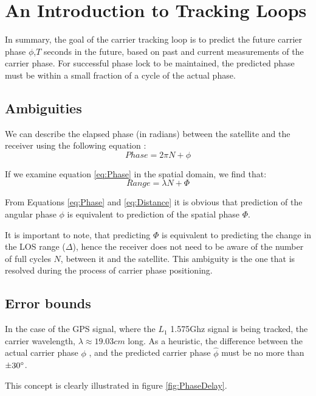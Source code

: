 \label{app9}
\chapter{An Introduction to Tracking Loops}
In summary, the goal of the carrier tracking loop is to predict the future carrier phase $\phi$,$T$ seconds in the future, based on past and current measurements of the carrier phase. For successful phase lock to be maintained, the predicted phase must be within a small fraction of a cycle of the actual phase. 

\section{Ambiguities}

We can describe the elapsed phase (in radians) between the satellite and the receiver using the following equation :  
\begin{equation}
Phase = 2 \pi N  + \phi 
\label{eq:Phase}
\end{equation}

If we examine equation \ref{eq:Phase} in the spatial domain, we find that: 
\begin{equation}
Range = \lambda N + \Phi
\label{eq:Distance}
\end{equation}

From Equations \ref{eq:Phase} and \ref{eq:Distance} it is obvious that prediction of the angular phase $\phi$ is equivalent to prediction of the spatial phase $\Phi$.

It is important to note, that predicting $\Phi$ is equivalent to predicting the change in the LOS range ($\Delta$), hence the receiver does not need to be aware of the number of full cycles $N$, between it and the satellite. This ambiguity is the one that is resolved during the process of carrier phase positioning. 

\section{Error bounds}
In the case of the GPS signal, where the $L_1$ 1.575Ghz signal is being tracked, the carrier wavelength, $\lambda \approx 19.03 cm$ long. As a heuristic, the difference between the actual carrier phase $\phi$ , and the predicted carrier phase $\hat{\phi}$ must be no more than $\pm30 \degree$. 

This concept is clearly illustrated in figure \ref{fig:PhaseDelay}. 

